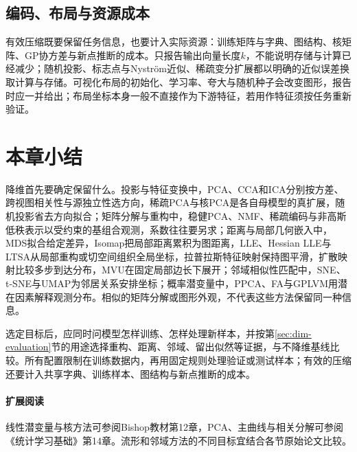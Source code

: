 \subsection{编码、布局与资源成本}

有效压缩既要保留任务信息，也要计入实际资源：训练矩阵与字典、图结构、核矩阵、GP协方差与新点推断的成本。只报告输出向量长度$k$，不能说明存储与计算已经减少；随机投影、标志点与Nystr\"om近似、稀疏变分扩展都以明确的近似误差换取计算与存储。可视化布局的初始化、学习率、夸大与随机种子会改变图形，报告时应一并给出；布局坐标本身一般不直接作为下游特征，若用作特征须按任务重新验证。

\section{本章小结}
\label{sec:dim-summary}

降维首先要确定保留什么。投影与特征变换中，PCA、CCA和ICA分别按方差、跨视图相关性与源独立性选方向，稀疏PCA与核PCA是各自母模型的真扩展，随机投影省去方向拟合；矩阵分解与重构中，稳健PCA、NMF、稀疏编码与非高斯低秩表示以受约束的基组合观测，系数往往要另求；距离与局部几何嵌入中，MDS拟合给定差异，Isomap把局部距离累积为图距离，LLE、Hessian LLE与LTSA从局部重构或切空间组织全局坐标，拉普拉斯特征映射保持图平滑，扩散映射比较多步到达分布，MVU在固定局部边长下展开；邻域相似性匹配中，SNE、t-SNE与UMAP为邻居关系安排坐标；概率潜变量中，PPCA、FA与GPLVM用潜在因素解释观测分布。相似的矩阵分解或图形外观，不代表这些方法保留同一种信息。

选定目标后，应同时问模型怎样训练、怎样处理新样本，并按第\ref{sec:dim-evaluation}节的用途选择重构、距离、邻域、留出似然等证据，与不降维基线比较。所有配置限制在训练数据内，再用固定规则处理验证或测试样本；有效的压缩还要计入共享字典、训练样本、图结构与新点推断的成本。

\paragraph{扩展阅读}
线性潜变量与核方法可参阅Bishop教材第12章，PCA、主曲线与相关分解可参阅《统计学习基础》第14章。流形和邻域方法的不同目标宜结合各节原始论文比较。

\endgroup

